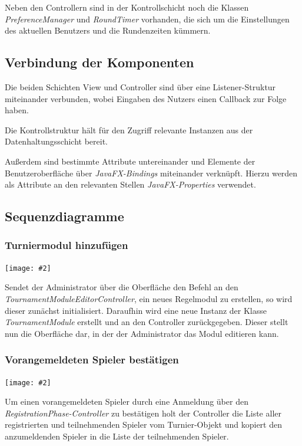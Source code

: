 \documentclass[11pt]{article}
\newcommand{\includediagram}[2]{
	\begin{center}
		\texttt{[image: \#2]}
	\end{center}
}
\begin{document}
Neben den Controllern sind in der Kontrollschicht noch die Klassen \textit{PreferenceManager} und \textit{RoundTimer} vorhanden, die sich um die Einstellungen des aktuellen Benutzers und die Rundenzeiten kümmern.

\subsection{Verbindung der Komponenten}

Die beiden Schichten View und Controller sind über eine Listener-Struktur miteinander verbunden, wobei Eingaben des Nutzers einen Callback zur Folge haben.

Die Kontrollstruktur hält für den Zugriff relevante Instanzen aus der Datenhaltungsschicht bereit.

Außerdem sind bestimmte Attribute untereinander und Elemente der Benutzeroberfläche über \textit{JavaFX-Bindings} miteinander verknüpft. Hierzu werden als Attribute an den relevanten Stellen \textit{JavaFX-Properties} verwendet.

\newpage

\subsection{Sequenzdiagramme}

\subsubsection{Turniermodul hinzufügen}

\includediagram{1.0}{sequence-add-tournament-module.png}

Sendet der Administrator über die Oberfläche den Befehl an den \textit{TournamentModuleEditorController}, ein neues Regelmodul zu erstellen, so wird dieser zunächst initialisiert. Daraufhin wird eine neue Instanz der Klasse \textit{TournamentModule} erstellt und an den Controller zurückgegeben. Dieser stellt nun die Oberfläche dar, in der der Administrator das Modul editieren kann.

\newpage

\subsubsection{Vorangemeldeten Spieler bestätigen}

\includediagram{1.0}{sequence-verify-registered-player.png}

Um einen vorangemeldeten Spieler durch eine Anmeldung über den \textit{RegistrationPhase-Controller} zu bestätigen holt der Controller die Liste aller registrierten und teilnehmenden Spieler vom Turnier-Objekt und kopiert den anzumeldenden Spieler in die Liste der teilnehmenden Spieler.
\end{document}
